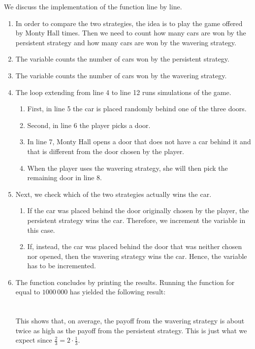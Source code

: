     
We discuss the implementation of the function  line by line.
\begin{enumerate}
\item In order to compare the two strategies, the idea is to play the game offered by Monty Hall
       times.  Then we need to count how many cars are won by the persistent strategy and how
      many cars are won by the wavering strategy.
\item The variable  counts the number of cars won by the persistent strategy.
\item The variable   counts the number of cars won by the wavering  strategy.
\item The  loop extending from line 4 to line 12 runs  simulations of the
       game.
       \begin{enumerate}
       \item First, in line 5 the car is placed randomly behind one of the three doors.
       \item Second, in line 6 the player picks a door.
       \item In line 7, Monty Hall opens a door that does not have a car behind it and that
             is different from the door chosen by the player.
       \item When the player uses the wavering strategy, she will then pick the remaining door in line 8.
       \end{enumerate}
\item Next, we check which of the two strategies actually wins the car.
      \begin{enumerate}
      \item If the car was placed behind the door originally chosen by the player, the persistent
            strategy wins the car.  Therefore, we increment the variable  in
            this case.
      \item If, instead, the car was placed behind the door that was neither chosen nor opened, then
            the wavering strategy wins the car.  Hence, the variable  has to be incremented.
      \end{enumerate}
\item The function concludes by printing the results.  Running the function for  equal to
      $1000\,000$ has yielded the following result:
      \\[0.2cm]
      \hspace*{1.3cm}
       \\ 
      \hspace*{1.3cm}
      \\[0.2cm]
      This shows that, on average, the payoff from the wavering strategy is about twice as high as the
      payoff from the persistent strategy.  This is just what we expect since $\frac{2}{3} = 2 \cdot \frac{1}{3}$.
\end{enumerate}

